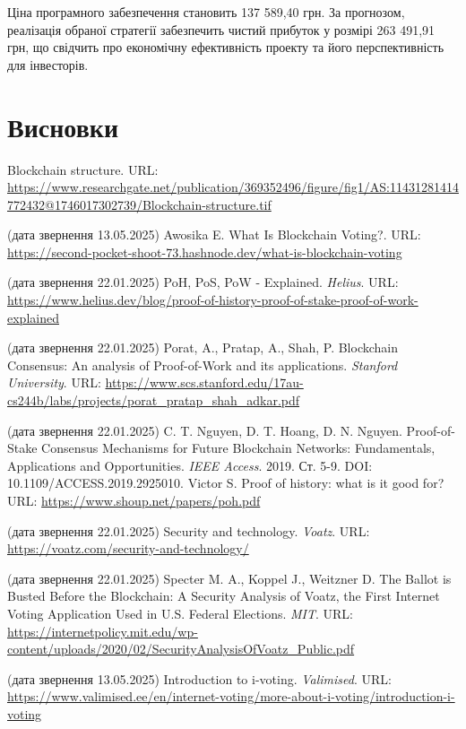 \documentclass[14pt]{extreport}
\newcommand{\tocchap}[1]{
  \chapter*{#1}
  \addcontentsline{toc}{chapter}{\MakeUppercase{#1}}
}
\begin{document}
  Ціна програмного забезпечення становить 137 589,40 грн. За прогнозом, реалізація обраної стратегії забезпечить чистий прибуток у розмірі 263 491,91 грн, що свідчить про економічну ефективність проекту та його перспективність для інвесторів.
  
  \tocchap{Висновки}
  
  \renewcommand\bibname{\MakeUppercase{Список літератури}}
  \begin{thebibliography}{99}
     Blockchain structure. URL: \url{https://www.researchgate.net/publication/369352496/figure/fig1/AS:11431281414772432@1746017302739/Blockchain-structure.tif}

    (дата звернення 13.05.2025)
     Awosika E. What Is Blockchain Voting?. URL: \url{https://second-pocket-shoot-73.hashnode.dev/what-is-blockchain-voting}

    (дата звернення 22.01.2025)
     PoH, PoS, PoW - Explained. \textit{Helius}. URL: \url{https://www.helius.dev/blog/proof-of-history-proof-of-stake-proof-of-work-explained}
    
    (дата звернення 22.01.2025)
     Porat, A., Pratap, A., Shah, P. Blockchain Consensus: An analysis of Proof-of-Work and its applications. \textit{Stanford University}. URL: \url{https://www.scs.stanford.edu/17au-cs244b/labs/projects/porat_pratap_shah_adkar.pdf}
    
    (дата звернення 22.01.2025)
     C. T. Nguyen, D. T. Hoang, D. N. Nguyen. Proof-of-Stake Consensus Mechanisms for Future Blockchain Networks: Fundamentals, Applications and Opportunities. \textit{IEEE Access}. 2019. Ст. 5-9. DOI: 10.1109/ACCESS.2019.2925010.
     Victor S. Proof of history: what is it good for? URL: \url{https://www.shoup.net/papers/poh.pdf}
    
    (дата звернення 22.01.2025)
     Security and technology. \textit{Voatz}. URL: \url{https://voatz.com/security-and-technology/}
    
    (дата звернення 22.01.2025)
     Specter M. A., Koppel J., Weitzner D. The Ballot is Busted Before the Blockchain: A Security Analysis of Voatz, the First Internet Voting Application Used in U.S. Federal Elections. \textit{MIT}. URL: \url{https://internetpolicy.mit.edu/wp-content/uploads/2020/02/SecurityAnalysisOfVoatz_Public.pdf}

    (дата звернення 13.05.2025)
     Introduction to i-voting. \textit{Valimised}. 
    URL: \url{https://www.valimised.ee/en/internet-voting/more-about-i-voting/introduction-i-voting}
    

\end{thebibliography}
\end{document}
